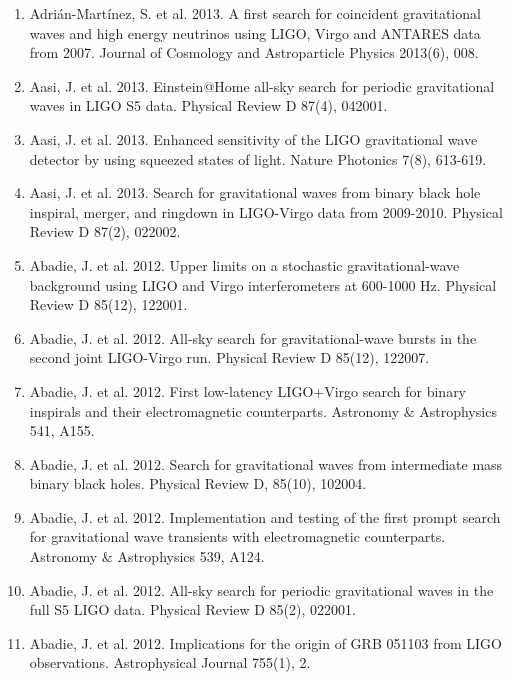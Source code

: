 \documentclass[margin,line]{res}
\begin{document}
\begin{resume}
\begin{enumerate}
\item Adri\'{a}n-Mart\'{i}nez, S. et al. 2013. A first search for coincident gravitational waves and high energy neutrinos using LIGO, Virgo and ANTARES data from 2007. Journal of Cosmology and Astroparticle Physics 2013(6), 008. 

\item Aasi, J. et al. 2013. Einstein@Home all-sky search for periodic gravitational waves in LIGO S5 data. Physical Review D  87(4), 042001. 

\item Aasi, J. et al. 2013. Enhanced sensitivity of the LIGO gravitational wave detector by using squeezed states of light. Nature Photonics 7(8),  613-619.

\item Aasi, J. et al. 2013. Search for gravitational waves from binary black hole inspiral, merger, and ringdown in LIGO-Virgo data from 2009-2010. Physical Review D  87(2), 022002. 

\item Abadie, J. et al. 2012. Upper limits on a stochastic gravitational-wave background using LIGO and Virgo interferometers at 600-1000 Hz. Physical Review D  85(12), 122001. 

\item Abadie, J. et al. 2012. All-sky search for gravitational-wave bursts in the second joint LIGO-Virgo run. Physical Review D 85(12), 122007. 

\item Abadie, J. et al. 2012. First low-latency LIGO+Virgo search for binary inspirals and their electromagnetic counterparts. Astronomy \& Astrophysics 541, A155. 

\item Abadie, J. et al. 2012. Search for gravitational waves from intermediate mass binary black holes. Physical Review D, 85(10), 102004. 

\item Abadie, J. et al. 2012. Implementation and testing of the first prompt search for gravitational wave transients with electromagnetic counterparts. Astronomy \& Astrophysics 539, A124.

\item Abadie, J. et al. 2012. All-sky search for periodic gravitational waves in the full S5 LIGO data. Physical Review D 85(2), 022001.

\item Abadie, J. et al. 2012. Implications for the origin of GRB 051103 from LIGO observations. Astrophysical Journal 755(1), 2. 


\end{enumerate}
\end{resume}
\end{document}
